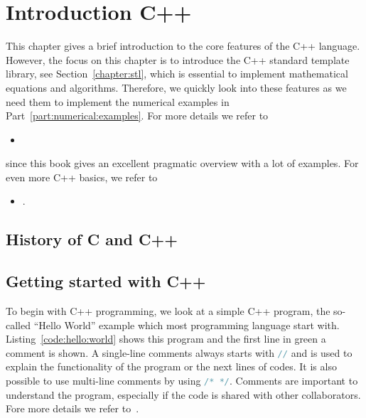 
\chapter{Introduction C++}
This chapter gives a brief introduction to the core features of the C++ language. However, the focus on this chapter is to introduce the C++ standard template library, see Section~\ref{chapter:stl}, which is essential to implement mathematical equations and algorithms. Therefore, we quickly look into these features as we need them to implement the numerical examples in Part~\ref{part:numerical:examples}. For more details we refer to
\begin{itemize}
\item {}
\end{itemize}
since this book gives an excellent pragmatic overview with a lot of examples. For even more C++ basics, we refer to
\begin{itemize}
\item {}.
\end{itemize}
\section{History of C and C++}

\section{Getting started with C++}
To begin with C++ programming, we look at a simple C++ program, the so-called ``Hello World'' example which most programming language start with. Listing~\ref{code:hello:world} shows this program and the first line in green a comment is shown. A  single-line comments always starts with \lstinline[language=C++]|//| and is used to explain the functionality of the program or the next lines of codes. It is also possible to use multi-line comments by using \lstinline[language=C++]{/* */}. Comments are important to understand the program, especially if the code is shared with other collaborators. Fore more details we refer to~\cite{kernighan1974elements}.

